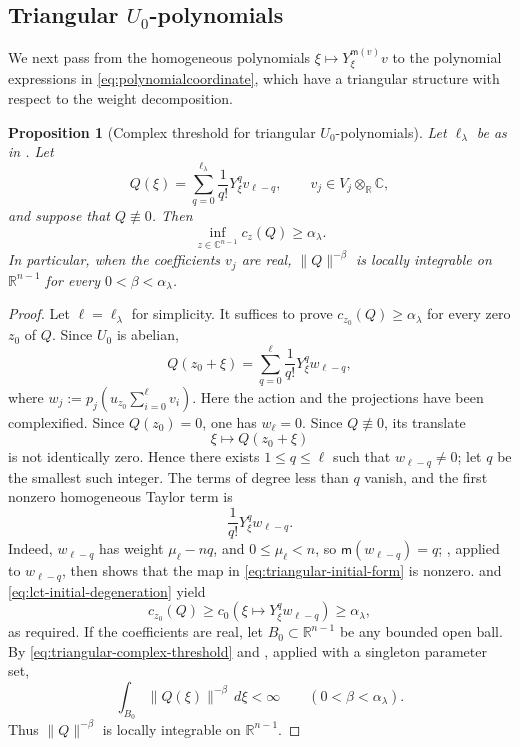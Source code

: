 \documentclass[reqno,11pt]{amsart}
\numberwithin{equation}{section}
\newtheorem{proposition}[theorem]{Proposition}
\theoremstyle{definition}
\theoremstyle{remark}
\begin{document}
\subsection{Triangular $U_0$-polynomials}
\label{s:triangular-U-polynomials}
We next pass from the homogeneous polynomials $\xi\mapsto Y_\xi^{\mathsf{m}(v)} v$ to the polynomial expressions in \eqref{eq:polynomialcoordinate}, which have a triangular structure with respect to the weight decomposition.


\begin{proposition}[Complex threshold for triangular $U_0$-polynomials]
\label{prop:triangular-U-local-integrability}
Let $\ell_\lambda$ be as in . Let
$$
Q(\xi)=
\sum_{q=0}^{\ell_\lambda}\frac1{q!}Y_\xi^qv_{\ell-q},
\qquad v_j\in V_j\otimes_{\mathbb R}\mathbb C,
$$
and suppose that $Q\not\equiv0$. Then
\begin{equation}\label{eq:triangular-complex-threshold}
\inf_{z\in \mathbb C^{n-1}} c_z(Q)\ge\alpha_\lambda.
\end{equation}
In particular, when the coefficients $v_j$ are real, $\|Q\|^{-\beta}$ is
locally integrable on $\mathbb R^{n-1}$ for every
$0<\beta<\alpha_\lambda$.
\end{proposition}

\begin{proof}
Let $\ell=\ell_{\lambda}$ for simplicity. It suffices to prove $ c_{z_0}(Q)
\ge\alpha_\lambda$ for every zero $z_0$ of $Q$. Since $U_0$ is abelian,
$$
Q(z_0+\xi)
=
\sum_{q=0}^{\ell}\frac1{q!}Y_\xi^qw_{\ell-q},
$$
where
$
w_j:=p_j\!\left(u_{z_0}\sum_{i=0}^{\ell}v_i\right).
$
Here the action and the projections have been complexified. Since
$Q(z_0)=0$, one has $w_\ell=0$. Since $Q\not\equiv0$, its translate
$$
\xi\mapsto Q(z_0+\xi)
$$
is not identically zero. Hence there exists $1\le q\le\ell$ such that
$w_{\ell-q}\ne0$; let $q$ be the smallest such integer.
The terms of degree less than $q$ vanish, and the first
nonzero homogeneous Taylor term is
\begin{equation}\label{eq:triangular-initial-form}
\frac1{q!}Y_\xi^qw_{\ell-q}.
\end{equation}
Indeed, $w_{\ell-q}$ has weight $\mu_\ell-nq$, and
$0\le\mu_\ell<n$, so $\mathsf m(w_{\ell-q})=q$; , applied to $w_{\ell-q}$, then shows that the map in
\eqref{eq:triangular-initial-form} is nonzero.
 and
\eqref{eq:lct-initial-degeneration} yield
$$
c_{z_0}(Q)
\ge c_0(\xi\mapsto Y_\xi^qw_{\ell-q})
\ge\alpha_\lambda,
$$
as required.
If the coefficients are real, let $B_0\subset\mathbb R^{n-1}$ be any
bounded open ball. By \eqref{eq:triangular-complex-threshold} and
, applied with a singleton
parameter set,
$$
\int_{B_0}\|Q(\xi)\|^{-\beta}\,d\xi<\infty
\qquad(0<\beta<\alpha_\lambda).
$$
Thus $\|Q\|^{-\beta}$ is locally integrable on $\mathbb R^{n-1}$.
\end{proof}
\end{document}
